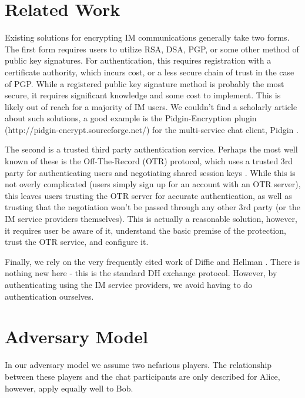\documentclass[twoside,10pt]{article}
\begin{document}
\begin{multicols}{2}
\section{Related Work}
Existing solutions for encrypting IM communications generally take two forms.  The first form requires users to utilize RSA, DSA, PGP, or some other method of public key signatures.  For authentication, this requires registration with a certificate authority, which incurs cost, or a less secure chain of trust in the case of PGP.  While a registered public key signature method is probably the most secure, it requires significant knowledge and some cost to implement.  This is likely out of reach for a majority of IM users.  We couldn't find a scholarly article about such solutions, a good example is the Pidgin-Encryption plugin (http://pidgin-encrypt.sourceforge.net/) for the multi-service chat client, Pidgin \cite{PidginEncryption}.  

The second is a trusted third party authentication service.  Perhaps the most well known of these is the Off-The-Record (OTR) protocol, which uses a trusted 3rd party for authenticating users and negotiating shared session keys \cite{DiRaimondo:2005:SOM:1102199.1102216}.  While this is not overly complicated (users simply sign up for an account with an OTR server), this leaves users trusting the OTR server for accurate authentication, as well as trusting that the negotiation won't be passed through any other 3rd party (or the IM service providers themselves).  This is actually a reasonable solution, however, it requires user be aware of it, understand the basic premise of the protection, trust the OTR service, and configure it.

Finally, we rely on the very frequently cited work of Diffie and Hellman \cite{diffie1976new}.  There is nothing new here - this is the standard DH exchange protocol.  However, by authenticating using the IM service providers, we avoid having to do authentication ourselves.

\section{Adversary Model}
In our adversary model we assume two nefarious players.  The relationship between these players and the chat participants are only described for Alice, however, apply equally well to Bob.


\end{multicols}
\end{document}
